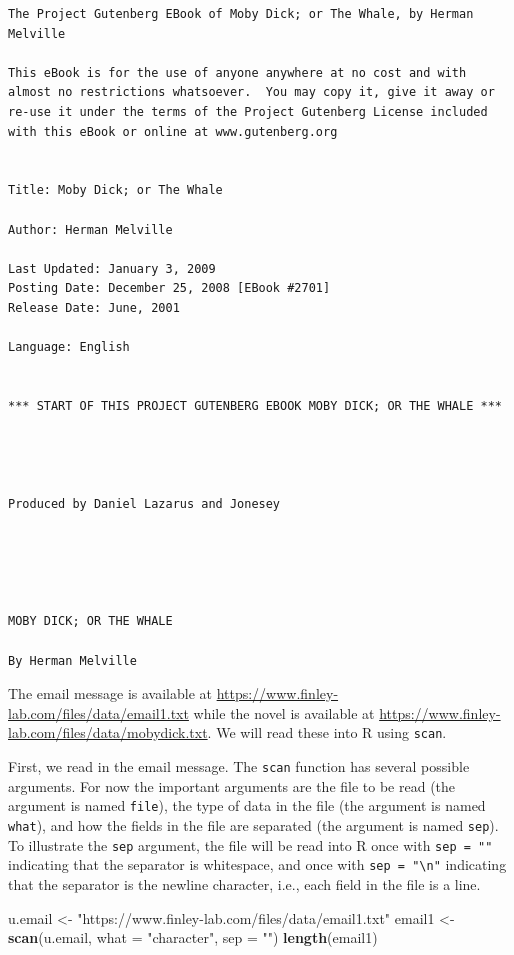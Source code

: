 \documentclass[
]{krantz}
\newenvironment{Shaded}{\begin{snugshade}}{\end{snugshade}}
\newcommand{\DataTypeTok}[1]{\textcolor[rgb]{0.13,0.29,0.53}{#1}}
\newcommand{\KeywordTok}[1]{\textcolor[rgb]{0.13,0.29,0.53}{\textbf{#1}}}
\newcommand{\NormalTok}[1]{#1}
\newcommand{\StringTok}[1]{\textcolor[rgb]{0.31,0.60,0.02}{#1}}
\begin{document}
\begin{verbatim}
The Project Gutenberg EBook of Moby Dick; or The Whale, by Herman Melville

This eBook is for the use of anyone anywhere at no cost and with
almost no restrictions whatsoever.  You may copy it, give it away or
re-use it under the terms of the Project Gutenberg License included
with this eBook or online at www.gutenberg.org


Title: Moby Dick; or The Whale

Author: Herman Melville

Last Updated: January 3, 2009
Posting Date: December 25, 2008 [EBook #2701]
Release Date: June, 2001

Language: English


*** START OF THIS PROJECT GUTENBERG EBOOK MOBY DICK; OR THE WHALE ***




Produced by Daniel Lazarus and Jonesey





MOBY DICK; OR THE WHALE

By Herman Melville
\end{verbatim}

The email message is available at \url{https://www.finley-lab.com/files/data/email1.txt} while the novel is available at \url{https://www.finley-lab.com/files/data/mobydick.txt}. We will read these into R using \texttt{scan}.

First, we read in the email message. The \texttt{scan} function has several possible arguments. For now the important arguments are the file to be read (the argument is named \texttt{file}), the type of data in the file (the argument is named \texttt{what}), and how the fields in the file are separated (the argument is named \texttt{sep}). To illustrate the \texttt{sep} argument, the file will be read into R once with \texttt{sep\ =\ ""} indicating that the separator is whitespace, and once with \texttt{sep\ =\ "\textbackslash{}n"} indicating that the separator is the newline character, i.e., each field in the file is a line.

\begin{Shaded}
\begin{Highlighting}[]
\NormalTok{u.email \textless{}{-}}\StringTok{ "https://www.finley{-}lab.com/files/data/email1.txt"}
\NormalTok{email1 \textless{}{-}}\StringTok{ }\KeywordTok{scan}\NormalTok{(u.email, }\DataTypeTok{what =} \StringTok{"character"}\NormalTok{, }\DataTypeTok{sep =} \StringTok{""}\NormalTok{)}
\KeywordTok{length}\NormalTok{(email1)}
\end{Highlighting}
\end{Shaded}
\end{document}
